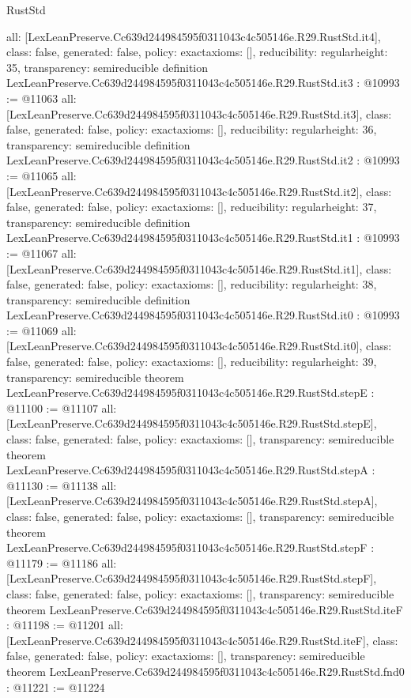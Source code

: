 \begin{lexlean}{RustStd}
\begin{coremodule}
{  all: [LexLeanPreserve.Cc639d244984595f0311043c4c505146e.R29.RustStd.it4],
  class: false,
  generated: false,
  policy: exact{axioms: []},
  reducibility: regular{height: 35},
  transparency: semireducible
}
definition LexLeanPreserve.Cc639d244984595f0311043c4c505146e.R29.RustStd.it3 : @10993 := @11063 {
  all: [LexLeanPreserve.Cc639d244984595f0311043c4c505146e.R29.RustStd.it3],
  class: false,
  generated: false,
  policy: exact{axioms: []},
  reducibility: regular{height: 36},
  transparency: semireducible
}
definition LexLeanPreserve.Cc639d244984595f0311043c4c505146e.R29.RustStd.it2 : @10993 := @11065 {
  all: [LexLeanPreserve.Cc639d244984595f0311043c4c505146e.R29.RustStd.it2],
  class: false,
  generated: false,
  policy: exact{axioms: []},
  reducibility: regular{height: 37},
  transparency: semireducible
}
definition LexLeanPreserve.Cc639d244984595f0311043c4c505146e.R29.RustStd.it1 : @10993 := @11067 {
  all: [LexLeanPreserve.Cc639d244984595f0311043c4c505146e.R29.RustStd.it1],
  class: false,
  generated: false,
  policy: exact{axioms: []},
  reducibility: regular{height: 38},
  transparency: semireducible
}
definition LexLeanPreserve.Cc639d244984595f0311043c4c505146e.R29.RustStd.it0 : @10993 := @11069 {
  all: [LexLeanPreserve.Cc639d244984595f0311043c4c505146e.R29.RustStd.it0],
  class: false,
  generated: false,
  policy: exact{axioms: []},
  reducibility: regular{height: 39},
  transparency: semireducible
}
theorem LexLeanPreserve.Cc639d244984595f0311043c4c505146e.R29.RustStd.stepE : @11100 := @11107 {
  all: [LexLeanPreserve.Cc639d244984595f0311043c4c505146e.R29.RustStd.stepE],
  class: false,
  generated: false,
  policy: exact{axioms: []},
  transparency: semireducible
}
theorem LexLeanPreserve.Cc639d244984595f0311043c4c505146e.R29.RustStd.stepA : @11130 := @11138 {
  all: [LexLeanPreserve.Cc639d244984595f0311043c4c505146e.R29.RustStd.stepA],
  class: false,
  generated: false,
  policy: exact{axioms: []},
  transparency: semireducible
}
theorem LexLeanPreserve.Cc639d244984595f0311043c4c505146e.R29.RustStd.stepF : @11179 := @11186 {
  all: [LexLeanPreserve.Cc639d244984595f0311043c4c505146e.R29.RustStd.stepF],
  class: false,
  generated: false,
  policy: exact{axioms: []},
  transparency: semireducible
}
theorem LexLeanPreserve.Cc639d244984595f0311043c4c505146e.R29.RustStd.iteF : @11198 := @11201 {
  all: [LexLeanPreserve.Cc639d244984595f0311043c4c505146e.R29.RustStd.iteF],
  class: false,
  generated: false,
  policy: exact{axioms: []},
  transparency: semireducible
}
theorem LexLeanPreserve.Cc639d244984595f0311043c4c505146e.R29.RustStd.fnd0 : @11221 := @11224 {
}
\end{coremodule}
\end{lexlean}
